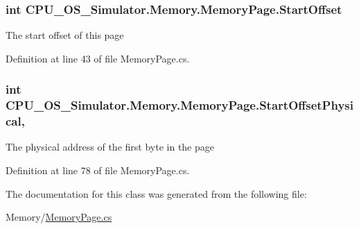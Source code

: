 \hypertarget{class_c_p_u___o_s___simulator_1_1_memory_1_1_memory_page_ad700979e51dd3d05470c681588c6fa79}{}
\subsubsection[{Start\+Offset}]{\setlength{\rightskip}{0pt plus 5cm}int C\+P\+U\+\_\+\+O\+S\+\_\+\+Simulator.\+Memory.\+Memory\+Page.\+Start\+Offset\hspace{0.3cm}{\ttfamily [get]}}\label{class_c_p_u___o_s___simulator_1_1_memory_1_1_memory_page_ad700979e51dd3d05470c681588c6fa79}


The start offset of this page 



Definition at line 43 of file Memory\+Page.\+cs.

\hypertarget{class_c_p_u___o_s___simulator_1_1_memory_1_1_memory_page_af31a2243a3e68ec635315929859fa358}{}
\subsubsection[{Start\+Offset\+Physical}]{\setlength{\rightskip}{0pt plus 5cm}int C\+P\+U\+\_\+\+O\+S\+\_\+\+Simulator.\+Memory.\+Memory\+Page.\+Start\+Offset\+Physical\hspace{0.3cm}{\ttfamily [get]}, {\ttfamily [set]}}\label{class_c_p_u___o_s___simulator_1_1_memory_1_1_memory_page_af31a2243a3e68ec635315929859fa358}


The physical address of the first byte in the page 



Definition at line 78 of file Memory\+Page.\+cs.



The documentation for this class was generated from the following file\+:\begin{DoxyCompactItemize}
\item 
Memory/\hyperlink{_memory_page_8cs}{Memory\+Page.\+cs}\end{DoxyCompactItemize}
